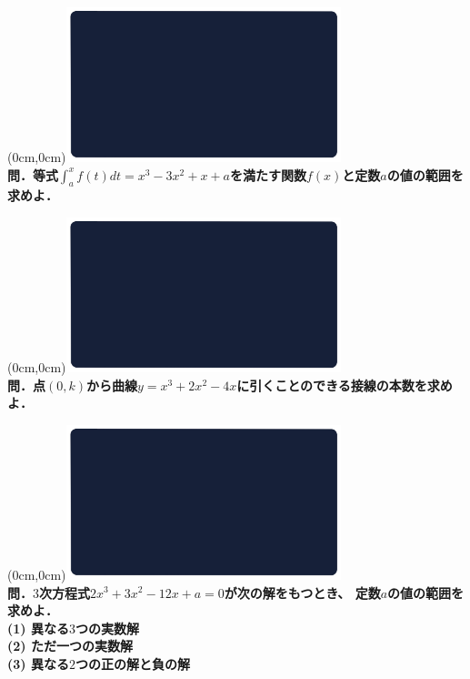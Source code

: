 \documentclass[10pt,
fleqn,
dvipdfmx,
uplatex
]{jsarticle}
\begin{document}
\at(0cm,0cm){\includegraphics[width=8cm,bb=0 0 1920 1080]{./media_local/smart_background/数II微積.jpeg}}
\vspace{0.3zw}\\
\noindent\Large 
\bf\boldmath 問．等式$\displaystyle\int_a^xf\left(t\right)dt=x^3-3x^2+x+a$を満たす関数$f\left(x\right)$と定数$a$の値の範囲を求めよ．


\newpage



\at(0cm,0cm){\includegraphics[width=8cm,bb=0 0 1920 1080]{./media_local/smart_background/数II微積.jpeg}}
\vspace{0.3zw}\\
\noindent\Large 
\bf\boldmath 問．点$\left(0,k\right)$から曲線$y=x^3+2x^2-4x$に引くことのできる接線の本数を求めよ．


\newpage



\at(0cm,0cm){\includegraphics[width=8cm,bb=0 0 1920 1080]{./media_local/smart_background/数II微積.jpeg}}
\vspace{0.3zw}\\
\noindent\normalsize 
\bf\boldmath 問．$3$次方程式$2x^3+3x^2-{12}x+a=0$が次の解をもつとき、
定数$a$の値の範囲を求めよ．\\
(1)  異なる$3$つの実数解\\
(2)  ただ一つの実数解\\
(3)  異なる$2$つの正の解と負の解\\
\end{document}
